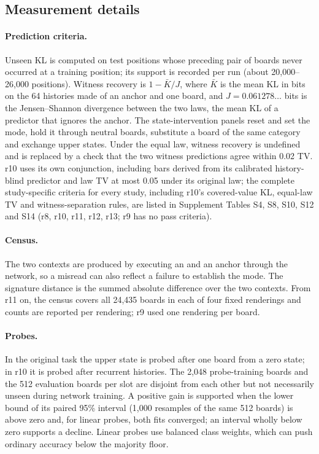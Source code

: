 \subsection{Measurement details}\label{app:measurement}

\paragraph{Prediction criteria.} Unseen KL is computed on test positions
whose preceding pair of boards never occurred at a training position; its
support is recorded per run (about 20,000--26,000 positions). Witness
recovery is $1 - \bar{K}/J$, where $\bar{K}$ is the mean KL in bits on the 64
histories made of an anchor and one \Ncat{} board, and $J = 0.061278\ldots$
bits is the Jensen--Shannon divergence between the two laws, the mean KL of a
predictor that ignores the anchor. The state-intervention panels reset and
set the mode, hold it through neutral boards, substitute a board of the same
category and exchange upper states. Under the equal law, witness recovery is
undefined and is replaced by a check that the two witness predictions agree
within 0.02 TV. r10 uses its own conjunction, including bars derived
from its calibrated history-blind predictor and law TV at most 0.05 under
its original law; the complete study-specific criteria for every study,
including r10's covered-value KL, equal-law TV and witness-separation rules,
are listed in Supplement Tables S4, S8, S10, S12 and S14 (r8, r10,
r11, r12, r13; r9 has no pass criteria).

\paragraph{Census.} The two contexts are produced by executing an \Lcat{} and
an \Hcat{} anchor through the network, so a misread can also reflect a
failure to establish the mode. The signature distance is the summed absolute
difference over the two contexts. From r11 on, the census covers all 24,435
boards in each of four fixed renderings and counts are reported per
rendering; r9 used one rendering per board.

\paragraph{Probes.} In the original task the upper state is probed after one
board from a zero state; in r10 it is probed after recurrent histories. The
2,048 probe-training boards and the 512 evaluation boards per slot are
disjoint from each other but not necessarily unseen during network training.
A positive gain is supported when the lower bound of its paired 95\%
interval (1,000 resamples of the same 512 boards) is above zero and, for
linear probes, both fits converged; an interval wholly below zero supports a
decline. Linear probes use balanced class weights, which can push ordinary
accuracy below the majority floor.

